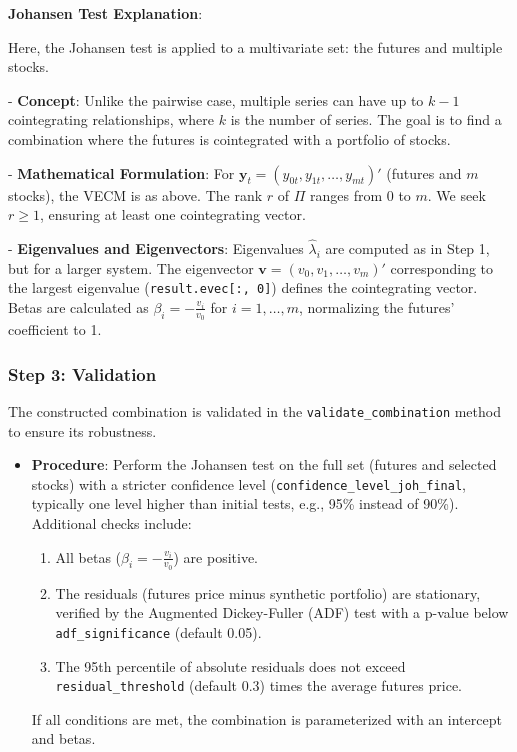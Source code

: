 \documentclass[a4paper,12pt]{article}
\begin{document}
\textbf{Johansen Test Explanation}:

Here, the Johansen test is applied to a multivariate set: the futures and multiple stocks.

- \textbf{Concept}: Unlike the pairwise case, multiple series can have up to \(k-1\) cointegrating relationships, where \(k\) is the number of series. The goal is to find a combination where the futures is cointegrated with a portfolio of stocks.

- \textbf{Mathematical Formulation}: For \(\mathbf{y}_t = (y_{0t}, y_{1t}, \ldots, y_{mt})'\) (futures and \(m\) stocks), the VECM is as above. The rank \(r\) of \(\Pi\) ranges from 0 to \(m\). We seek \(r \geq 1\), ensuring at least one cointegrating vector.


- \textbf{Eigenvalues and Eigenvectors}: Eigenvalues \(\hat{\lambda}_i\) are computed as in Step 1, but for a larger system. The eigenvector \(\mathbf{v} = (v_0, v_1, \ldots, v_m)'\) corresponding to the largest eigenvalue (\texttt{result.evec[:, 0]}) defines the cointegrating vector. Betas are calculated as \(\beta_i = -\frac{v_i}{v_0}\) for \(i = 1, \ldots, m\), normalizing the futures’ coefficient to 1.

\subsubsection{Step 3: Validation}
The constructed combination is validated in the \texttt{validate\_combination} method to ensure its robustness.

\begin{itemize}
    \item \textbf{Procedure}: Perform the Johansen test on the full set (futures and selected stocks) with a stricter confidence level (\texttt{confidence\_level\_joh\_final}, typically one level higher than initial tests, e.g., 95\% instead of 90\%). Additional checks include:
    \begin{enumerate}
        \item All betas (\(\beta_i = -\frac{v_i}{v_0}\)) are positive.
        \item The residuals (futures price minus synthetic portfolio) are stationary, verified by the Augmented Dickey-Fuller (ADF) test with a p-value below \texttt{adf\_significance} (default 0.05).
        \item The 95th percentile of absolute residuals does not exceed \texttt{residual\_threshold} (default 0.3) times the average futures price.
    \end{enumerate}
    If all conditions are met, the combination is parameterized with an intercept and betas.
\end{itemize}
\end{document}
